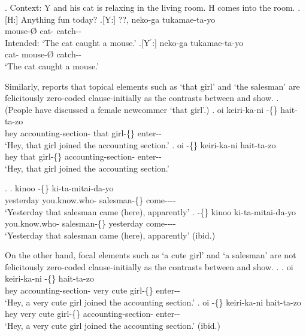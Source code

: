 %
\ex. Context: Y and his cat is relaxing in the living room.
	H comes into the room.
	\a.[H:] Anything fun today?
	\bg.[Y:] ??, neko-ga tukamae-ta-yo \\
		mouse-{\O} cat- catch-- \\
		Intended: `The cat caught a mouse.'
	\bg.[Y$^{\prime}$:] neko-ga  tukamae-ta-yo \\
		cat- mouse-{\O} catch-- \\
		`The cat caught a mouse.'


Similarly,
 reports that topical elements such as
 `that girl' and  `the salesman' are felicitously zero-coded clause-initially
as the contrasts between \Next[a--b] and \NNext[a--b] show.
%
\ex.\label{Par:Ex:Anoko} (People have discussed a female newcommer  `that girl'.)
 \ag. oi keiri-ka-ni  -\{\} hait-ta-zo \\
      hey accounting-section- that girl-\{\} enter--\\
      `Hey, that girl joined the accounting section.'
 \bg. oi  -\{\} keiri-ka-ni hait-ta-zo \\
      hey that girl-\{\} accounting-section- enter--\\
      `Hey, that girl joined the accounting section.'
      \hfill{\cite[293-294]{niwa06}}

\ex.\label{Par:Ex:Seerusuman}
 \ag. kinoo  -\{\} ki-ta-mitai-da-yo \\
      yesterday you.know.who- salesman-\{\} come---- \\
      `Yesterday that salesman came (here), apparently'
 \bg.  -\{\} kinoo ki-ta-mitai-da-yo \\
      you.know.who- salesman-\{\} yesterday come---- \\
      `Yesterday that salesman came (here), apparently'
      \hfill{(ibid.)}


On the other hand, focal elements such as  `a cute girl' and  `a salesman' are not felicitously zero-coded clause-initially as the contrasts between \Next[a--b] and \NNext[a--b] show.
%
\ex.
 \ag. oi keiri-ka-ni   -\{\} hait-ta-zo \\
      hey accounting-section- very cute girl-\{\} enter--\\
      `Hey, a very cute girl joined the accounting section.'
 \bg. oi   -\{\} keiri-ka-ni hait-ta-zo \\
      hey very cute girl-\{\} accounting-section- enter--\\
      `Hey, a very cute girl joined the accounting section.'
      \hfill{(ibid.)}

